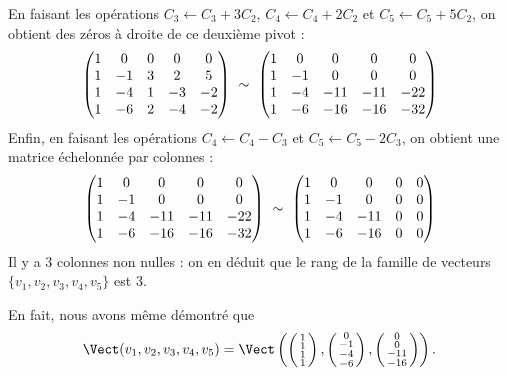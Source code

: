 \documentclass[class=report,crop=false]{standalone}
\begin{document}
\begin{exemple}
En faisant les opérations $C_3 \leftarrow C_3+3C_2$,
$C_4\leftarrow C_4+2C_2$ et
$C_5\leftarrow C_5+5C_2$, on obtient des zéros à droite de ce deuxième pivot :
$$\begin{pmatrix}
1&0&0&0&0\cr
1&-1&3&2&5\cr
1&-4&1&-3&-2\cr
1&-6&2&-4&-2 \cr
\end{pmatrix}\  \sim\
\begin{pmatrix}
1&0&0&0&0\cr
1&-1&0&0&0\cr
1&-4&-11&-11&-22\cr
1&-6&-16&-16&-32 \cr
\end{pmatrix}$$
Enfin, en faisant les opérations $C_4\leftarrow C_4-C_3$
et $C_5\leftarrow C_5-2C_3$, on obtient une matrice échelonnée par colonnes :
$$\begin{pmatrix}
1&0&0&0&0\cr
1&-1&0&0&0\cr
1&-4&-11&-11&-22\cr
1&-6&-16&-16&-32 \cr
\end{pmatrix}\ \sim\
\begin{pmatrix}
1&0&0&0&0\cr
1&-1&0&0&0\cr
1&-4&-11&0&0\cr
1&-6&-16&0&0 \cr
\end{pmatrix}$$
Il y a $3$ colonnes non nulles : on en déduit que le rang de
la famille de vecteurs $\{v_1,v_2,v_3,v_4,v_5\}$ est $3$.

En fait, nous avons même démontré que
$$\Vect (v_1,v_2,v_3,v_4,v_5)=
\Vect \left( \left(\begin{smallmatrix}1\\1\\1\\1\end{smallmatrix}\right) ,\left(\begin{smallmatrix}0\\-1\\-4\\-6\end{smallmatrix}\right),
\left(\begin{smallmatrix}0\\0\\-11\\-16\end{smallmatrix}\right)\right ). $$
\end{exemple}
\end{document}
